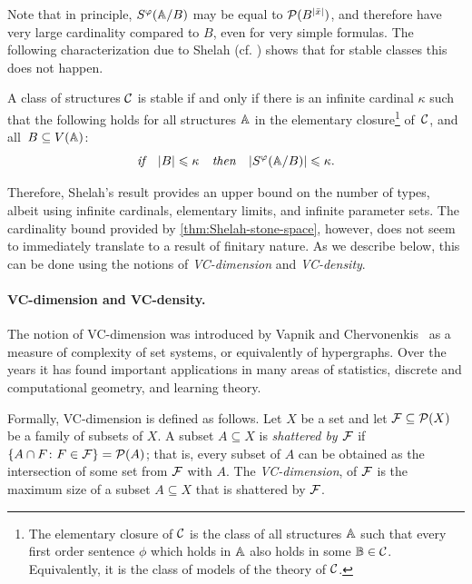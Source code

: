 Note that in principle, $S^\phi(\str A/B)$
may be equal to $\Pow(B^{|\bar x|})$, and therefore have very large cardinality compared to $B$, even for very simple formulas. 
The following characterization due to Shelah 
(cf. \cite[Theorem 2.2, Chapter II]{shelah1990classification})
shows that for stable classes this does not happen.
\begin{theorem}\label{thm:Shelah-stone-space}
A class of structures $\cal C$
	is stable if and only if 
	there is 
	an infinite cardinal $\kappa$
	such that the following holds for all
	structures
	$\str A$ in the elementary closure\footnote{The elementary closure of $\cal C$ is 
	the class of all structures $\str A$
	such that  every first order sentence $\phi$
	which holds in $\str A$ also holds in some $\str B\in \cal C$. Equivalently, it is the class of 
   models of the theory of $\cal C$.} of~$\cal C$, and all~$B\subset V(\str A)$:
$$  \textit{if\quad}|B|\le \kappa\textit {\quad then\quad}
|S^\phi(\str A/B)|\le \kappa.$$
\end{theorem}
Therefore,
Shelah's result provides an upper bound on the number of types, albeit using infinite cardinals, elementary limits, and infinite parameter sets.
 The cardinality bound provided by \cref{thm:Shelah-stone-space},
 however, does not seem to  immediately translate to a result of finitary nature. As we describe below,
 this can be done using the notions of {\em{VC-dimension}} and {\em{VC-density}}.

\paragraph{VC-dimension and VC-density.} The notion of VC-dimension was introduced by 
Vapnik and Chervonenkis~\cite{chervonenkis1971theory} as a measure of complexity of set systems, or equivalently of hypergraphs.
Over the years it
has found important applications in many areas of
statistics, discrete and computational geometry, 
and learning theory. 

Formally, VC-dimension is defined as follows. 
Let $X$ be a set and let  $\FFF\subseteq \Pow(X)$ 
be a family of subsets of $X$.
A subset $A\subseteq X$ is \emph{shattered by $\FFF$} if
$\{A\cap F\colon F\in \FFF\}=\Pow(A)$; that is, every subset of $A$ can be obtained as the intersection of some set from $\FFF$ with $A$. 
The \emph{VC-dimension},
of $\FFF$ is the maximum size of a subset $A\subseteq X$ that is shattered by
$\FFF$.

